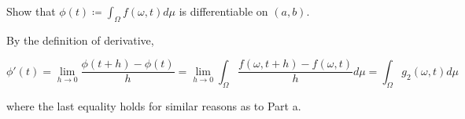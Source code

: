 \documentclass{article}
\begin{document}
Show that $\phi(t) \coloneq \int_\Omega f(\omega, t)d\mu$ is differentiable on $(a, b)$.

By the definition of derivative,

\[
\phi'(t) = \lim_{h \rightarrow 0} \frac{\phi(t+h) - \phi(t)}{h} = \lim_{h\rightarrow 0} \int_\Omega \frac{f(\omega, t+h) - f(\omega, t)}{h}d\mu = \int_\Omega g_2(\omega, t)d\mu
\]

where the last equality holds for similar reasons as to Part a.
\end{document}
